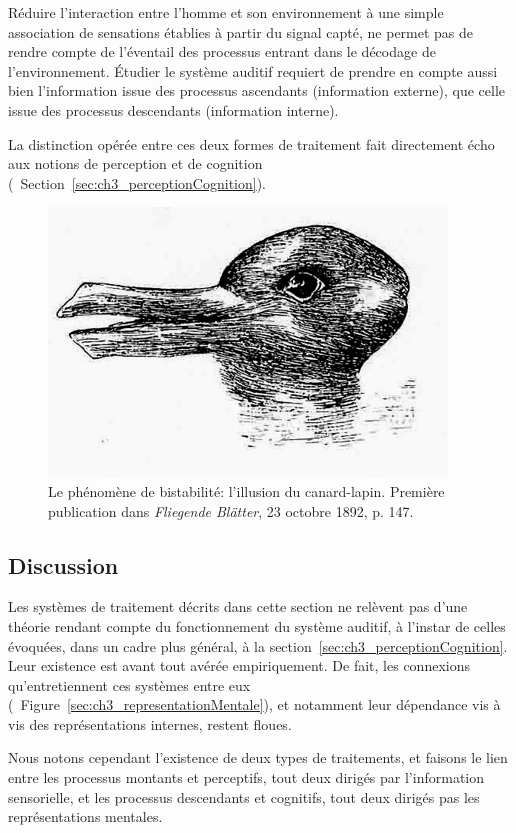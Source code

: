 Réduire l'interaction entre l'homme et son environnement à une simple association de sensations établies à partir du signal capté, ne permet pas de rendre compte de l'éventail des processus entrant dans le décodage de l'environnement. Étudier le système auditif requiert de prendre en compte aussi bien l'information issue des processus ascendants (information externe), que celle issue des processus descendants (information interne).

La distinction opérée entre ces deux formes de traitement fait directement écho aux notions de perception et de cognition (\cf~Section~\ref{sec:ch3_perceptionCognition}).

\begin{figure}[t]
        \myfloatalign
        \includegraphics[width=.6\linewidth]{gfx/ch_3/canard_lapin}
        \caption[Le phénomène de bistabilité: l'illusion du canard-lapin.]{Le phénomène de bistabilité: l'illusion du canard-lapin. Première publication dans \emph{Fliegende Blätter}, 23 octobre 1892, p. 147.}\label{fig:bistabilite}
\end{figure}

\subsection{Discussion}

Les systèmes de traitement décrits dans cette section ne relèvent pas d'une théorie rendant compte du fonctionnement du système auditif, à l'instar de celles évoquées, dans un cadre plus général, à la section~\ref{sec:ch3_perceptionCognition}. Leur existence est avant tout avérée empiriquement. De fait, les connexions qu'entretiennent ces systèmes entre eux (\cf~Figure~\ref{sec:ch3_representationMentale}), et notamment leur dépendance vis à vis des représentations internes, restent floues.

Nous notons cependant l'existence de deux types de traitements, et faisons le lien entre les processus montants et perceptifs, tout deux dirigés par l'information sensorielle, et les processus descendants et cognitifs, tout deux dirigés pas les représentations mentales.

